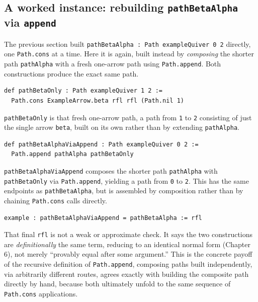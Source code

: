 \subsection{\texorpdfstring{A worked instance: rebuilding \texttt{pathBetaAlpha} via \texttt{append}}{A worked instance: rebuilding pathBetaAlpha via append}}\label{sec:12-path-algebras:05-path-composition:2}

The previous section built \texttt{pathBetaAlpha : Path exampleQuiver 0 2} directly, one \texttt{Path.cons} at a time. Here it is again, built instead by \emph{composing} the shorter path \texttt{pathAlpha} with a fresh one-arrow path using \texttt{Path.append}. Both constructions produce the exact same path.

\begin{lstlisting}
def pathBetaOnly : Path exampleQuiver 1 2 :=
  Path.cons ExampleArrow.beta rfl rfl (Path.nil 1)
\end{lstlisting}

\texttt{pathBetaOnly} is that fresh one-arrow path, a path from \texttt{1} to \texttt{2} consisting of just the single arrow \texttt{beta}, built on its own rather than by extending \texttt{pathAlpha}.

\begin{lstlisting}
def pathBetaAlphaViaAppend : Path exampleQuiver 0 2 :=
  Path.append pathAlpha pathBetaOnly
\end{lstlisting}

\texttt{pathBetaAlphaViaAppend} composes the shorter path \texttt{pathAlpha} with \texttt{pathBetaOnly} via \texttt{Path.append}, yielding a path from \texttt{0} to \texttt{2}. This has the same endpoints as \texttt{pathBetaAlpha}, but is assembled by composition rather than by chaining \texttt{Path.cons} calls directly.

\begin{lstlisting}
example : pathBetaAlphaViaAppend = pathBetaAlpha := rfl
\end{lstlisting}

That final \texttt{rfl} is not a weak or approximate check. It says the two constructions are \emph{definitionally} the same term, reducing to an identical normal form (Chapter 6), not merely ``provably equal after some argument.'' This is the concrete payoff of the recursive definition of \texttt{Path.append}, composing paths built independently, via arbitrarily different routes, agrees exactly with building the composite path directly by hand, because both ultimately unfold to the same sequence of \texttt{Path.cons} applications.

